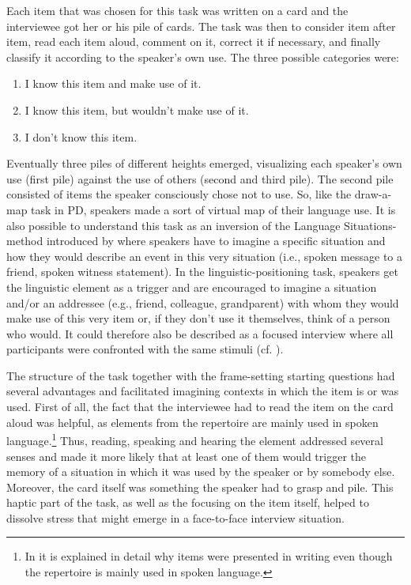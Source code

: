 \documentclass[output=paper]{langscibook}
\begin{document}
Each item that was chosen for this task was written on a card and the interviewee got her or his pile of cards. The task was then to consider item after item, read each item aloud, comment on it, correct it if necessary, and finally classify it according to the speaker’s own use. The three possible categories were:

\begin{enumerate}
\item  I know this item and make use of it.
\item I know this item, but wouldn’t make use of it.
\item I don’t know this item.
\end{enumerate}

Eventually three piles of different heights emerged, visualizing each speaker’s own use (first pile) against the use of others (second and third pile). The second pile consisted of items the speaker consciously chose not to use. So, like the draw-a-map task in PD, speakers made a sort of virtual map of their language use. It is also possible to understand this task as an inversion of the Language Situations-method introduced by \citet{Wiese2020} where speakers have to imagine a specific situation and how they would describe an event in this very situation (i.e., spoken message to a friend, spoken witness statement). In the linguistic-positioning task, speakers get the linguistic element as a trigger and are encouraged to imagine a situation and/or an addressee (e.g., friend, colleague, grandparent) with whom they would make use of this very item or, if they don’t use it themselves, think of a person who would. It could therefore also be described as a focused interview where all participants were confronted with the same stimuli (cf. \citealt[195--202]{Flick2007}).

The structure of the task together with the frame-setting starting questions had several advantages and facilitated imagining contexts in which the item is or was used. First of all, the fact that the interviewee had to read the item on the card aloud was helpful, as elements from the repertoire are mainly used in spoken language.\footnote{In \citet{JahnsToAppear} it is explained in detail why items were presented in writing even though the repertoire is mainly used in spoken language.} Thus, reading, speaking and hearing the element addressed several senses and made it more likely that at least one of them would trigger the memory of a situation in which it was used by the speaker or by somebody else. Moreover, the card itself was something the speaker had to grasp and pile. This haptic part of the task, as well as the focusing on the item itself, helped to dissolve stress that might emerge in a face-to-face interview situation.
\end{document}
